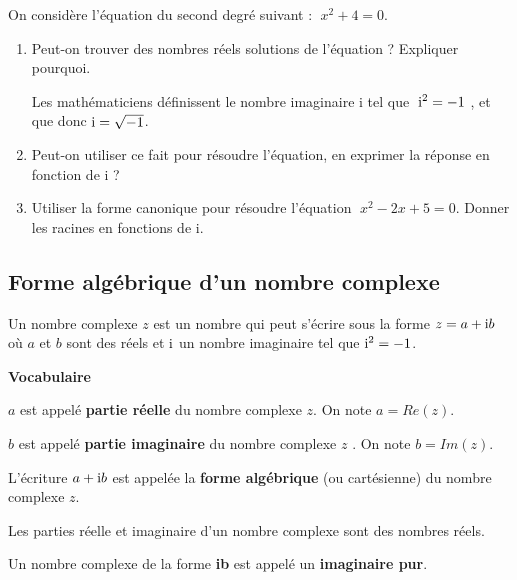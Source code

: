 \begin{lemma}
On considère l'équation du second degré suivant : $\; x^2+4=0 $.
\begin{enumerate}
\item Peut-on trouver  des nombres réels solutions de l'équation ? Expliquer pourquoi.

\medskip

Les mathématiciens définissent  le nombre imaginaire i tel que  $ \;\text{i}^2=-1 $ , et que donc $ \text{i}=\sqrt{-1} $.

\item Peut-on utiliser ce fait pour résoudre l'équation, en exprimer la réponse en fonction de i ?
\item Utiliser la forme canonique pour résoudre l'équation  $\; x^2-2x+5=0 $. Donner les racines en fonctions de i.
\end{enumerate}
\end{lemma}
 \subsection{Forme algébrique d'un nombre complexe}
 \begin{definition}
Un nombre complexe $ z $ est un nombre qui peut s'écrire  sous la forme $ z=a+\text{i} b $  où $a $ et $ b$  sont des réels et $ \text{i} $ un nombre imaginaire tel que $ \text{i}^2=-1 $.
 
 \end{definition}

\medskip
\textbf{Vocabulaire}

\medskip

$ a $ est appelé \textbf{partie réelle} du nombre complexe $ z $. On note $ a = Re(z)$. 
\medskip

$ b $  est appelé \textbf{partie imaginaire} du nombre complexe $ z$ . On note $ b = Im(z)$.

\medskip
L'écriture $ a+ \text{i} b$  est appelée  la \textbf{forme algébrique}  (ou cartésienne) du nombre complexe $ z $.

\medskip
\begin{remark}
 Les parties réelle et imaginaire d'un nombre complexe sont des nombres réels.
 \end{remark}
 \medskip
 
 Un nombre complexe de la forme \textbf{ib} est appelé un \textbf{imaginaire pur}.
 
